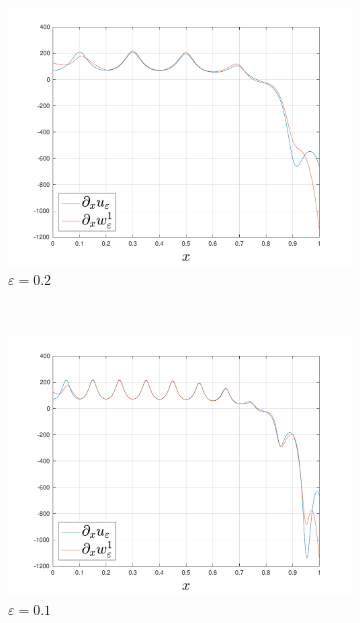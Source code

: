 \begin{example}
	\begin{figure}[h!tb]
    \centering
    \begin{subfigure}[b]{0.5\textwidth}
        \includegraphics[width=\textwidth]{src/img/du_eps_dw_1_eps_1.pdf}
        \caption{$\varepsilon = 0.2$}
    \end{subfigure}
    ~ %
    \begin{subfigure}[b]{0.5\textwidth}
        \includegraphics[width=\textwidth]{src/img/du_eps_dw_1_eps_2.pdf}
        \caption{$\varepsilon = 0.1$}
    \end{subfigure}
    \begin{subfigure}[b]{0.5\textwidth}

\end{subfigure}
\end{figure}
\end{example}
